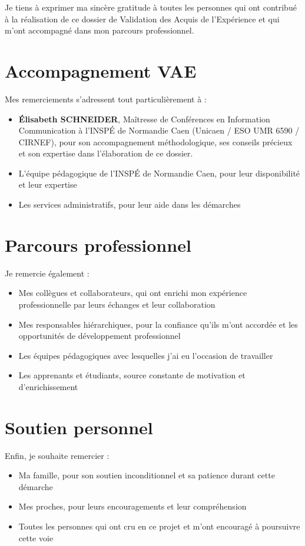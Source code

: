 \documentclass[12pt,a4paper]{report}
\begin{document}
{\small
Je tiens à exprimer ma sincère gratitude à toutes les personnes qui ont contribué à la réalisation de ce dossier de Validation des Acquis de l'Expérience et qui m'ont accompagné dans mon parcours professionnel.

\section*{Accompagnement VAE}
\vspace{-0.3cm}
Mes remerciements s'adressent tout particulièrement à :
\begin{itemize}[leftmargin=*, nosep]
    \item \textbf{Élisabeth SCHNEIDER}, Maîtresse de Conférences en Information Communication à l'INSPÉ de Normandie Caen (Unicaen / ESO UMR 6590 / CIRNEF), pour son accompagnement méthodologique, ses conseils précieux et son expertise dans l'élaboration de ce dossier.
    \item L'équipe pédagogique de l'INSPÉ de Normandie Caen, pour leur disponibilité et leur expertise
    \item Les services administratifs, pour leur aide dans les démarches
\end{itemize}

\section*{Parcours professionnel}
\vspace{-0.3cm}
Je remercie également :
\begin{itemize}[leftmargin=*, nosep]
    \item Mes collègues et collaborateurs, qui ont enrichi mon expérience professionnelle par leurs échanges et leur collaboration
    \item Mes responsables hiérarchiques, pour la confiance qu'ils m'ont accordée et les opportunités de développement professionnel
    \item Les équipes pédagogiques avec lesquelles j'ai eu l'occasion de travailler
    \item Les apprenants et étudiants, source constante de motivation et d'enrichissement
\end{itemize}

\section*{Soutien personnel}
\vspace{-0.3cm}
Enfin, je souhaite remercier :
\begin{itemize}[leftmargin=*, nosep]
    \item Ma famille, pour son soutien inconditionnel et sa patience durant cette démarche
    \item Mes proches, pour leurs encouragements et leur compréhension
    \item Toutes les personnes qui ont cru en ce projet et m'ont encouragé à poursuivre cette voie
\end{itemize}

}
\end{document}
